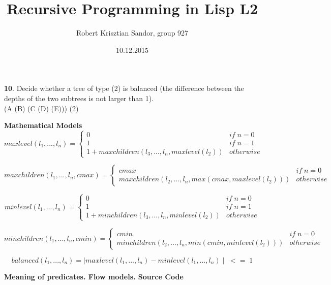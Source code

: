 \documentclass[11pt]{article}
\title{\textbf{Recursive Programming in Lisp L2}}
\author{Robert Krisztian Sandor, group 927}
\date{10.12.2015}
\begin{document}
\maketitle

\textbf{10}. Decide whether a tree of type (2) is balanced (the difference between the depths of the two subtrees is not larger than 1). \\
(A (B) (C (D) (E))) (2)

\textbf{Mathematical Models} \\

\[
maxlevel(l_1, ..., l_n) = 
\left \{
	\begin{array}{ll}
		0 & if \; n = 0 \\
		1 & if \; n = 1 \\
		1 + maxchildren(l_3, ..., l_n, maxlevel(l_2)) & otherwise 
	\end{array}
\right.
\]

\[
maxchildren(l_1, ..., l_n, cmax) = 
\left \{
	\begin{array}{ll}
		cmax & if \; n = 0 \\
		maxchildren(l_2, ..., l_n, max(cmax, maxlevel(l_2))) & otherwise 
	\end{array}
\right.
\]

\[
minlevel(l_1, ..., l_n) = 
\left \{
	\begin{array}{ll}
		0 & if \; n = 0 \\
		1 & if \; n = 1 \\
		1 + minchildren(l_3, ..., l_n, minlevel(l_2)) & otherwise 
	\end{array}
\right.
\]

\[
minchildren(l_1, ..., l_n, cmin) = 
\left \{
	\begin{array}{ll}
		cmin & if \; n = 0 \\
		minchildren(l_2, ..., l_n, min(cmin, minlevel(l_2))) & otherwise 
	\end{array}
\right.
\]

\[
balanced(l_1, ..., l_n) = \mid maxlevel(l_1, ..., l_n) - minlevel(l_1, ..., l_n) \mid \; <= \; 1 
\]

\newpage

\textbf{Meaning of predicates. Flow models. Source Code}
\end{document}
